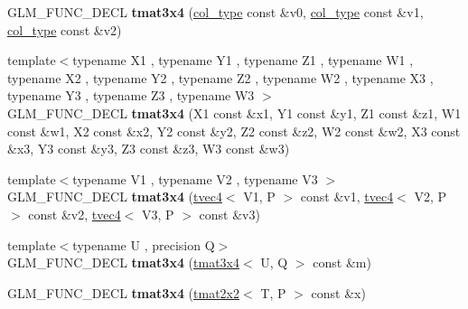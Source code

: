 \begin{DoxyCompactItemize}
\item 
\hypertarget{structglm_1_1detail_1_1tmat3x4_a6cab10dc73539c161f81089f4e49944b}{G\-L\-M\-\_\-\-F\-U\-N\-C\-\_\-\-D\-E\-C\-L {\bfseries tmat3x4} (\hyperlink{structglm_1_1detail_1_1tvec4}{col\-\_\-type} const \&v0, \hyperlink{structglm_1_1detail_1_1tvec4}{col\-\_\-type} const \&v1, \hyperlink{structglm_1_1detail_1_1tvec4}{col\-\_\-type} const \&v2)}\label{structglm_1_1detail_1_1tmat3x4_a6cab10dc73539c161f81089f4e49944b}

\item 
\hypertarget{structglm_1_1detail_1_1tmat3x4_a6fc2dce014e53c227b06f0ad379c92c0}{{\footnotesize template$<$typename X1 , typename Y1 , typename Z1 , typename W1 , typename X2 , typename Y2 , typename Z2 , typename W2 , typename X3 , typename Y3 , typename Z3 , typename W3 $>$ }\\G\-L\-M\-\_\-\-F\-U\-N\-C\-\_\-\-D\-E\-C\-L {\bfseries tmat3x4} (X1 const \&x1, Y1 const \&y1, Z1 const \&z1, W1 const \&w1, X2 const \&x2, Y2 const \&y2, Z2 const \&z2, W2 const \&w2, X3 const \&x3, Y3 const \&y3, Z3 const \&z3, W3 const \&w3)}\label{structglm_1_1detail_1_1tmat3x4_a6fc2dce014e53c227b06f0ad379c92c0}

\item 
\hypertarget{structglm_1_1detail_1_1tmat3x4_a6d3f2f2f3a7afbec8ec3b441fb904b20}{{\footnotesize template$<$typename V1 , typename V2 , typename V3 $>$ }\\G\-L\-M\-\_\-\-F\-U\-N\-C\-\_\-\-D\-E\-C\-L {\bfseries tmat3x4} (\hyperlink{structglm_1_1detail_1_1tvec4}{tvec4}$<$ V1, P $>$ const \&v1, \hyperlink{structglm_1_1detail_1_1tvec4}{tvec4}$<$ V2, P $>$ const \&v2, \hyperlink{structglm_1_1detail_1_1tvec4}{tvec4}$<$ V3, P $>$ const \&v3)}\label{structglm_1_1detail_1_1tmat3x4_a6d3f2f2f3a7afbec8ec3b441fb904b20}

\item 
\hypertarget{structglm_1_1detail_1_1tmat3x4_ac2ddd33140b6f24cf36d4b7e92a8ca02}{{\footnotesize template$<$typename U , precision Q$>$ }\\G\-L\-M\-\_\-\-F\-U\-N\-C\-\_\-\-D\-E\-C\-L {\bfseries tmat3x4} (\hyperlink{structglm_1_1detail_1_1tmat3x4}{tmat3x4}$<$ U, Q $>$ const \&m)}\label{structglm_1_1detail_1_1tmat3x4_ac2ddd33140b6f24cf36d4b7e92a8ca02}

\item 
\hypertarget{structglm_1_1detail_1_1tmat3x4_aacf61908e9f0d43b3cb3633ff642492f}{G\-L\-M\-\_\-\-F\-U\-N\-C\-\_\-\-D\-E\-C\-L {\bfseries tmat3x4} (\hyperlink{structglm_1_1detail_1_1tmat2x2}{tmat2x2}$<$ T, P $>$ const \&x)}\label{structglm_1_1detail_1_1tmat3x4_aacf61908e9f0d43b3cb3633ff642492f}


\end{DoxyCompactItemize}
